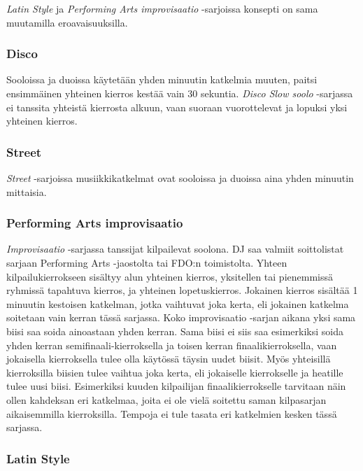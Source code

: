 \documentclass[12pt, a4paper, oneside]{article}
\begin{document}
\textit{Latin Style} ja \textit{Performing Arts improvisaatio} -sarjoissa konsepti on sama muutamilla eroavaisuuksilla.

\subsubsection{Disco}

Sooloissa ja duoissa käytetään yhden minuutin katkelmia muuten,
paitsi ensimmäinen yhteinen kierros kestää vain 30 sekuntia.
\textit{Disco Slow soolo} -sarjassa ei tanssita yhteistä kierrosta alkuun,
vaan suoraan vuorottelevat ja lopuksi yksi yhteinen kierros.

\subsubsection{Street}

\textit{Street} -sarjoissa musiikkikatkelmat ovat sooloissa ja duoissa aina yhden minuutin mittaisia.

\subsubsection{Performing Arts improvisaatio}

\textit{Improvisaatio} -sarjassa tanssijat kilpailevat soolona.
DJ saa valmiit soittolistat sarjaan Performing Arts -jaostolta tai FDO:n toimistolta.
Yhteen kilpailukierrokseen sisältyy alun yhteinen kierros,
yksitellen tai pienemmissä ryhmissä tapahtuva kierros,
ja yhteinen lopetuskierros.
Jokainen kierros sisältää 1 minuutin kestoisen katkelman,
jotka vaihtuvat joka kerta,
eli jokainen katkelma soitetaan vain kerran tässä sarjassa.
Koko improvisaatio -sarjan aikana yksi sama biisi saa soida ainoastaan yhden kerran.
Sama biisi ei siis saa esimerkiksi soida yhden kerran semifinaali-kierroksella ja toisen kerran finaalikierroksella,
vaan jokaisella kierroksella tulee olla käytössä täysin uudet biisit.
Myös yhteisillä kierroksilla biisien tulee vaihtua joka kerta,
eli jokaiselle kierrokselle ja heatille tulee uusi biisi.
Esimerkiksi kuuden kilpailijan finaalikierrokselle tarvitaan näin ollen kahdeksan eri katkelmaa,
joita ei ole vielä soitettu saman kilpasarjan aikaisemmilla kierroksilla.
Tempoja ei tule tasata eri katkelmien kesken tässä sarjassa.

\subsubsection{Latin Style}
\end{document}
